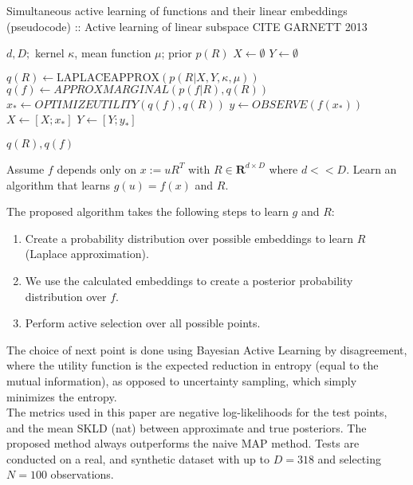 \begin{algorithm}
\caption{Simultaneous active learning of functions and their linear embeddings (pseudocode) :: Active learning of linear subspace CITE GARNETT 2013}

\begin{algorithmic} 
\REQUIRE $d, D;$ kernel $\kappa$, mean function $\mu$; prior $p(R)$ 
\STATE $X \leftarrow \emptyset$
\STATE $Y \leftarrow \emptyset$

\STATE $ q(R) \leftarrow \text{LAPLACEAPPROX}( p(R | X, Y, \kappa, \mu) ) $
\STATE $ q(f) \leftarrow  APPROXMARGINAL( p(f | R), q(R)) $
\STATE $ x_* \leftarrow OPTIMIZEUTILITY( q(f), q(R) )$
\STATE $ y \leftarrow OBSERVE( f( x_* ) ) $
\STATE $ X \leftarrow [X; x_*] $
\STATE $ Y \leftarrow[Y; y_*] $
\ENDWHILE

\RETURN $q(R), q(f)$
\end{algorithmic}

\end{algorithm}

\citep{Garnett2013} Assume $f$ depends only on $ x := uR^T $ with $ R \in \mathbf{R}^{d \times D}$ where $d << D$. 
Learn an algorithm that learns $g(u) = f(x)$ and $R$.

The proposed algorithm takes the following steps to learn $g$ and $R$:

\begin{enumerate}
\item Create a probability distribution over possible embeddings to learn $R$ (Laplace approximation).
\item We use the calculated embeddings to create a posterior probability distribution over $f$.
\item Perform active selection over all possible points.
\end{enumerate}

The choice of next point is done using Bayesian Active Learning by disagreement, where the utility function is the expected reduction in entropy (equal to the mutual information), as opposed to uncertainty sampling, which simply minimizes the entropy. \\

The metrics used in this paper are negative log-likelihoods for the test points, and the mean SKLD (nat) between approximate and true posteriors.
The proposed method always outperforms the naive MAP method.
Tests are conducted on a real, and synthetic dataset with up to $D = 318$ and selecting $N = 100$ observations. 

